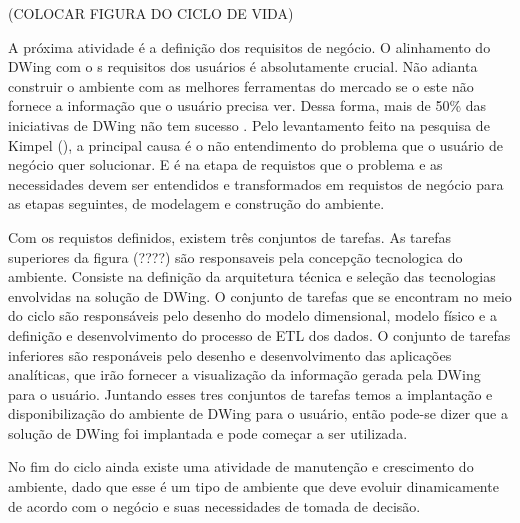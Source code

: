 (COLOCAR FIGURA DO CICLO DE VIDA)
%
%

A próxima atividade é a definição dos requisitos de negócio. O alinhamento do DWing com o s requisitos dos usuários é absolutamente crucial. Não adianta construir o ambiente com as melhores ferramentas do mercado se o este não fornece a informação que o usuário precisa ver. Dessa forma, mais de 50\% das iniciativas de DWing não tem sucesso \cite{sen2011}. Pelo levantamento feito na pesquisa de Kimpel (\citeyear{kimpel2013}), a principal causa é o não entendimento do problema que o usuário de negócio quer solucionar. E é na etapa de requistos que o problema e as necessidades devem ser entendidos e transformados em requistos de negócio para as etapas seguintes, de modelagem e construção do ambiente.

%

Com os requistos definidos, existem três conjuntos de tarefas. As tarefas superiores da figura (????) são responsaveis pela concepção tecnologica do ambiente. Consiste na definição da arquitetura técnica e  seleção das tecnologias envolvidas na solução de DWing. O conjunto de tarefas que se encontram no meio do ciclo são responsáveis pelo desenho do modelo dimensional, modelo físico e a definição e desenvolvimento do processo de ETL dos dados. O conjunto de tarefas inferiores são responáveis pelo desenho e desenvolvimento das aplicações analíticas, que irão fornecer a visualização da informação gerada pela DWing para o usuário. Juntando esses tres conjuntos de tarefas temos a implantação e disponibilização do ambiente de DWing para o usuário, então pode-se dizer que a solução de DWing foi implantada e pode começar a ser utilizada. 

%

No fim do ciclo ainda existe uma atividade de manutenção e crescimento do ambiente, dado que esse é um tipo de ambiente que deve evoluir dinamicamente de acordo com o negócio e suas necessidades de tomada de decisão.
